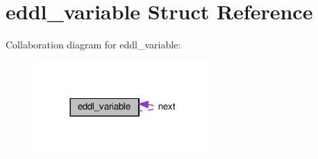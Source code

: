 \hypertarget{structeddl__variable}{}\section{eddl\+\_\+variable Struct Reference}
\label{structeddl__variable}


Collaboration diagram for eddl\+\_\+variable\+:\nopagebreak
\begin{figure}[H]
\begin{center}
\leavevmode
\includegraphics[width=194pt]{structeddl__variable__coll__graph}
\end{center}
\end{figure}
